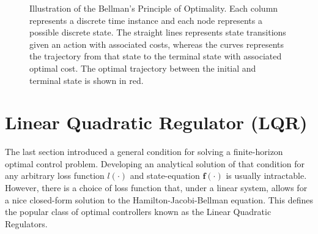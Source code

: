 \documentclass[a4paper,11pt]{book}
\numberwithin{figure}{chapter}
\numberwithin{equation}{chapter}
\numberwithin{table}{chapter}
\theoremstyle{definition}
\begin{document}
\begin{figure}[ht]
    \centering
    \caption{Illustration of the Bellman's Principle of Optimality. Each column represents a discrete time instance and each node represents a possible discrete state. The straight lines represents state transitions given an action with associated costs, whereas the curves represents the trajectory from that state to the terminal state with associated optimal cost. The optimal trajectory between the initial and terminal state is shown in red.}
    \label{fig:generalOC01}
\end{figure}

\section{Linear Quadratic Regulator (LQR)}

The last section introduced a general condition for solving a finite-horizon optimal control problem. Developing an analytical solution of that condition for any arbitrary loss function $l(\cdot)$ and state-equation $\bm{f}(\cdot)$ is usually intractable. However, there is a choice of loss function that, under a linear system, allows for a nice closed-form solution to the Hamilton-Jacobi-Bellman equation. This defines the popular class of optimal controllers known as the Linear Quadratic Regulators.
\end{document}
